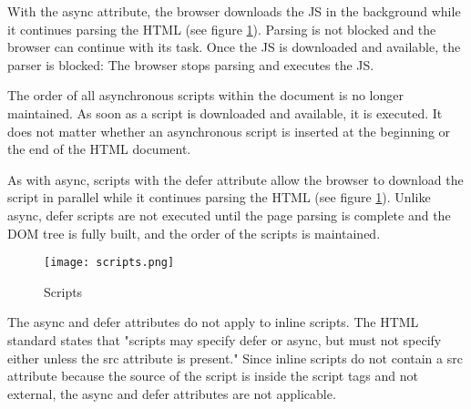 
With the async attribute, the browser downloads the JS in the background while it continues parsing the HTML (see figure \ref{figure:script_loading}).
Parsing is not blocked and the browser can continue with its task. 
Once the JS is downloaded and available, the parser is blocked: The browser stops parsing and executes the JS. %

The order of all asynchronous scripts within the document is no longer maintained.
As soon as a script is downloaded and available, it is executed.
It does not matter whether an asynchronous script is inserted at the beginning or the end of the HTML document. %




As with async, scripts with the defer attribute allow the browser to download the script in parallel while it continues parsing the HTML (see figure \ref{figure:script_loading}).
Unlike async, defer scripts are not executed until the page parsing is complete and the DOM tree is fully built, and the order of the scripts is maintained. %


\begin{figure}[h!]
\begin{center}
\texttt{[image: scripts.png]}
\caption{Scripts}
\label{figure:script_loading}
\end{center}
\end{figure}


The async and defer attributes do not apply to inline scripts.
The HTML standard states that "scripts may specify defer or async, but must not specify either unless the src attribute is present." %
Since inline scripts do not contain a src attribute because the source of the script is inside the script tags and not external, the async and defer attributes are not applicable.



